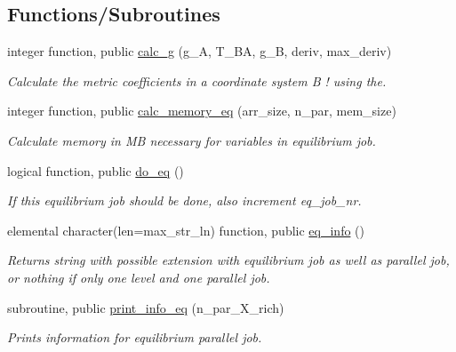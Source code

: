 \subsection*{Functions/\+Subroutines}
\begin{DoxyCompactItemize}
\item 
integer function, public \hyperlink{namespaceeq__utilities_a1426f7226577f8719472265fd882fbf4}{calc\+\_\+g} (g\+\_\+A, T\+\_\+\+BA, g\+\_\+B, deriv, max\+\_\+deriv)
\begin{DoxyCompactList}\small\item\em Calculate the metric coefficients in a coordinate system B ! using the. \end{DoxyCompactList}\item 
integer function, public \hyperlink{namespaceeq__utilities_a5a9f230ed9a6e627e31e882e9f4a00a1}{calc\+\_\+memory\+\_\+eq} (arr\+\_\+size, n\+\_\+par, mem\+\_\+size)
\begin{DoxyCompactList}\small\item\em Calculate memory in MB necessary for variables in equilibrium job. \end{DoxyCompactList}\item 
logical function, public \hyperlink{namespaceeq__utilities_a5109472305101af3a15e8e8717c426fd}{do\+\_\+eq} ()
\begin{DoxyCompactList}\small\item\em If this equilibrium job should be done, also increment {\ttfamily eq\+\_\+job\+\_\+nr}. \end{DoxyCompactList}\item 
elemental character(len=max\+\_\+str\+\_\+ln) function, public \hyperlink{namespaceeq__utilities_a34c5ddab45a54a6c738e5e0b8c7d55d6}{eq\+\_\+info} ()
\begin{DoxyCompactList}\small\item\em Returns string with possible extension with equilibrium job as well as parallel job, or nothing if only one level and one parallel job. \end{DoxyCompactList}\item 
subroutine, public \hyperlink{namespaceeq__utilities_a40f397d20b45432117744ca16870ddbb}{print\+\_\+info\+\_\+eq} (n\+\_\+par\+\_\+\+X\+\_\+rich)
\begin{DoxyCompactList}\small\item\em Prints information for equilibrium parallel job. \end{DoxyCompactList}\end{DoxyCompactItemize}
